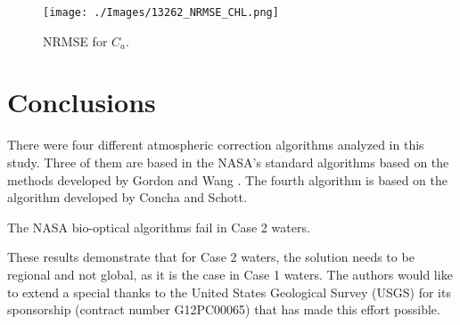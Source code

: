\documentclass[draft]{spie}  %
\begin{document}

\begin{figure}[htbp!]
  \centering
  \texttt{[image: ./Images/13262\_NRMSE\_CHL.png]}
  \caption{NRMSE for $C_a$.\label{fig:NRMSE130919CHL} } 
\end{figure}


\section{Conclusions}
\label{sec:conc}  %
There were four different atmospheric correction algorithms analyzed in this study. Three of them are based in the NASA's standard algorithms based on the methods developed by Gordon and Wang \cite{Gordon:1994}. The fourth algorithm is based on the algorithm developed by Concha and Schott\cite{Concha2014SPIE}.

The NASA bio-optical algorithms fail in Case 2 waters. 

These results demonstrate that for Case 2 waters, the solution needs to be regional and not global, as it is the case in Case 1 waters.
\acknowledgments     %
The authors would like to extend a special thanks to the United States Geological Survey (USGS) for its sponsorship (contract number G12PC00065) that has made this effort possible.

   
\end{document}
